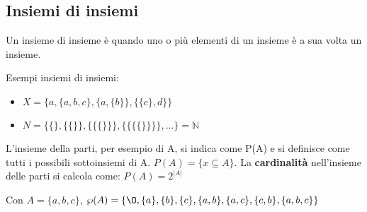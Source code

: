 \subsection{Insiemi di insiemi}
\begin{definition}[Insieme]
Un insieme di insieme è quando uno o più elementi di un insieme è a sua volta un insieme.
\end{definition}
\begin{example}
Esempi insiemi di insiemi:
    \begin{itemize}
        \item $X = \{a, \{a, b, c\}, \{a, \{b\}\}, \{\{c\},d\}\}$
        \item $N = \{\{\}, \{\{\}\}, \{\{\{\}\}\}, \{\{\{\{\}\}\}\}, ...\} = \mathbb{N}$
    \end{itemize}
\end{example}

\begin{definition}
L'insieme della parti, per esempio di A, si indica come P(A) e si definisce come tutti i possibili sottoinsiemi di A. $P(A) = \{x \subseteq A\}$. La \textbf{cardinalità} nell'insieme delle parti si calcola come: $P(A) = 2^{|A|}$
\end{definition}
\begin{example}
    Con $A = \{a, b, c\}$, $\wp(A) = \{\O, \{a\}, \{b\}, \{c\}, \{a, b\}, \{a, c\}, \{c, b\}, \{a, b, c\}\}$
\end{example}
